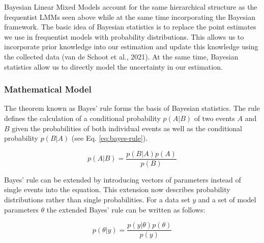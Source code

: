 \documentclass[
  doc,12pt,floatsintext]{apa7}
\begin{document}
Bayesian Linear Mixed Models account for the same hierarchical structure as the frequentist LMMs seen above while at the same time incorporating the Bayesian framework. The basic idea of Bayesian statistics is to replace the point estimates we use in frequentist models with probability distributions. This allows us to incorporate prior knowledge into our estimation and update this knowledge using the collected data (van de Schoot et al., 2021). At the same time, Bayesian statistics allow us to directly model the uncertainty in our estimation.

\subsubsection{Mathematical Model}\label{mathematical-model}

The theorem known as Bayes' rule forms the basis of Bayesian statistics. The rule defines the calculation of a conditional probability \(p(A|B)\) of two events \(A\) and \(B\) given the probabilities of both individual events as well as the conditional probability \(p(B|A)\) (see Eq. \eqref{eq:bayes-rule}).

\begin{equation}
p(A|B) = \frac{p(B|A)p(A)}{p(B)}
\label{eq:bayes-rule}
\end{equation}

Bayes' rule can be extended by introducing vectors of parameters instead of single events into the equation. This extension now describes probability distributions rather than single probabilities. For a data set \(y\) and a set of model parameters \(\theta\) the extended Bayes' rule can be written as follows:

\begin{equation}
p(\theta|y) = \frac{p(y|\theta)p(\theta)}{p(y)}
\label{eq:bayes-rule-distributions}
\end{equation}
\end{document}
